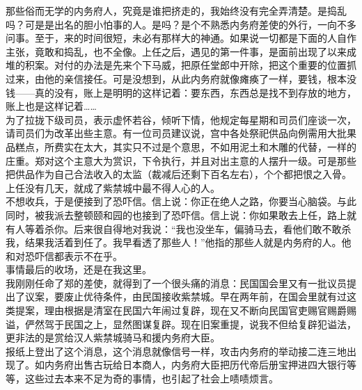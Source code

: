 那些俗而无学的内务府人，究竟是谁把挤走的，我始终没有完全弄清楚。是捣乱吗？可是是出名的胆小怕事的人。是吗？是个不熟悉内务府差使的外行，一向不多问事。至于，来的时间很短，未必有那样大的神通。如果说一切都是下面的人自作主张，竟敢和捣乱，也不全像。上任之后，遇见的第一件事，是面前出现了以来成堆的积案。对付的办法是先来个下马威，把原任堂郎中开除，把这个重要的位置抓过来，由他的亲信接任。可是没想到，从此内务府就像瘫痪了一样，要钱，根本没钱——真的没有，账上是明明的这样记着：要东西，东西总是找不到存放的地方，账上也是这样记着……\\

为了拉拢下级司员，表示虚怀若谷，倾听下情，他规定每星期和司员们座谈一次，请司员们为改革出些主意。有一位司员建议说，宫中各处祭祀供品向例需用大批果品糕点，所费实在太大，其实只不过是个意思，不如用泥土和木雕的代替，一样的庄重。郑对这个主意大为赏识，下令执行，并且对出主意的人摆升一级。可是那些把供品作为自己合法收入的太监（裁减后还剩下百名左右），个个都把恨之入骨。上任没有几天，就成了紫禁城中最不得人心的人。\\

不想收兵，于是便接到了恐吓信。信上说：你正在绝人之路，你要当心脑袋。与此同时，被我派去整顿颐和园的也接到了恐吓信。信上说：你如果敢去上任，路上就有人等着杀你。后来很自得地对我说：“我也没坐车，偏骑马去，看他们敢不敢杀我，结果我活着到任了。我早看透了那些人！”他指的那些人就是内务府的人。他和对恐吓信都表示不在乎。\\

事情最后的收场，还是在我这里。\\

我刚刚任命了郑的差使，就得到了一个很头痛的消息：民国国会里又有一批议员提出了议案，要废止优待条件，由民国接收紫禁城。早在两年前，在国会里就有过这类提案，理由根据是清室在民国六年闹过复辟，现在又不断向民国官吏赐官赐爵赐谥，俨然驾于民国之上，显然图谋复辟。现在旧案重提，说我不但给复辟犯谥法，更非法的是赏给汉人紫禁城骑马和援内务府大臣。\\

报纸上登出了这个消息，这个消息就像信号一样，攻击内务府的举动接二连三地出现了。如内务府出售古玩给日本商人，内务府大臣把历代帝后册宝押进四大银行等等，这些过去本来不足为奇的事情，也引起了社会上啧啧烦言。\\

